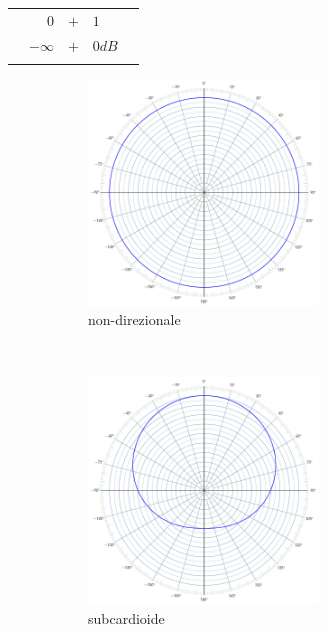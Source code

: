 \begin{table}[ht]
\begin{center}
\begin{tabular}{rrcll}
                & $0$          & $+$ & $1$                  & \\
                & $-\infty$    & $+$ & $0dB$            & \\ %
& \\
\end{tabular}
\end{center}
\label{tab:polarcoef}
\end{table}

\begin{figure}[h]
    \centering
    \begin{subfigure}[t]{0.48\textwidth}
        \centering
        \includegraphics[height=6cm]{CAPITOLI/_TIKZ/POLAR/omni}
        \caption{non-direzionale}%
        \label{pol:omni-p}
    \end{subfigure}%
    ~
    \begin{subfigure}[t]{0.48\textwidth}
        \centering
        \includegraphics[height=6cm]{CAPITOLI/_TIKZ/POLAR/subcardioid}
        \caption{subcardioide}%
        \label{pol:sub-p}
    \end{subfigure}
    \\
    \begin{subfigure}[t]{0.48\textwidth}
        \centering

\end{subfigure}
\end{figure}
